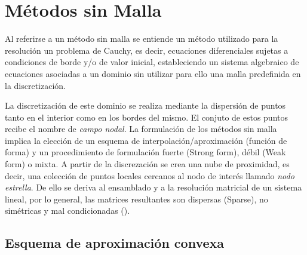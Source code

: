 \section{Métodos sin Malla}


Al referirse a un método sin malla se entiende un método utilizado para la resolución un problema de Cauchy, es decir, ecuaciones diferenciales sujetas a condiciones de borde y/o de valor inicial, estableciendo un sistema algebraico de ecuaciones asociadas a un dominio sin utilizar para ello una malla predefinida en la discretización. 

La discretización de este dominio se realiza mediante la dispersión de puntos tanto en el interior como en los bordes del mismo. El conjuto de estos puntos recibe el nombre de \textit{campo nodal}. La formulación de los métodos sin malla implica la elección de un esquema de interpolación/aproximación (función de forma) y un procedimiento de formulación fuerte (Strong form), débil (Weak form) o mixta. A partir de la discrezación se crea una nube de proximidad, es decir, una colección de puntos locales cercanos al nodo de interés llamado \textit{nodo estrella}. De ello se deriva al ensamblado y a la resolución matricial de un sistema lineal, por lo general, las matrices resultantes son dispersas (Sparse), no simétricas y mal condicionadas (\cite{LIBRO:liu-intro}). 


\subsection{Esquema de aproximación convexa}

